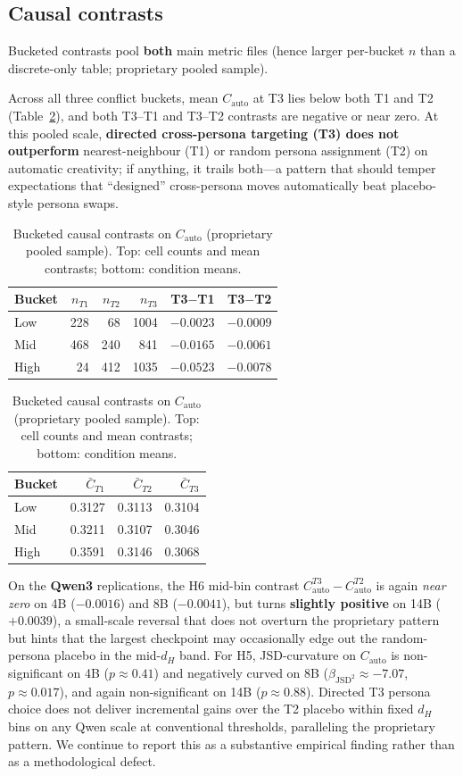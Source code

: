 \documentclass[sigconf,nonacm]{acmart}
\begin{document}
\subsection{Causal contrasts}

Bucketed contrasts pool \textbf{both} main metric files (hence larger per-bucket $n$ than a discrete-only table; proprietary pooled sample).

Across all three conflict buckets, mean $C_{\mathrm{auto}}$ at T3 lies below both T1 and T2 (Table~\ref{tab:causal}), and both T3--T1 and T3--T2 contrasts are negative or near zero. At this pooled scale, \textbf{directed cross-persona targeting (T3) does not outperform} nearest-neighbour (T1) or random persona assignment (T2) on automatic creativity; if anything, it trails both---a pattern that should temper expectations that ``designed'' cross-persona moves automatically beat placebo-style persona swaps.

\begin{table}[t]
\centering
\footnotesize
\setlength{\tabcolsep}{4pt}
\begin{tabular}{@{}lrrrrr@{}}
\toprule
Bucket & $n_{T1}$ & $n_{T2}$ & $n_{T3}$ & T3$-$T1 & T3$-$T2 \\
\midrule
Low  & 228 &  68 & 1004 & $-0.0023$ & $-0.0009$ \\
Mid  & 468 & 240 &  841 & $-0.0165$ & $-0.0061$ \\
High &  24 & 412 & 1035 & $-0.0523$ & $-0.0078$ \\
\bottomrule
\end{tabular}
\par\medskip
\begin{tabular}{@{}lrrr@{}}
\toprule
Bucket & $\bar{C}_{T1}$ & $\bar{C}_{T2}$ & $\bar{C}_{T3}$ \\
\midrule
Low  & 0.3127 & 0.3113 & 0.3104 \\
Mid  & 0.3211 & 0.3107 & 0.3046 \\
High & 0.3591 & 0.3146 & 0.3068 \\
\bottomrule
\end{tabular}
\caption{Bucketed causal contrasts on $C_{\mathrm{auto}}$ (proprietary pooled sample). Top: cell counts and mean contrasts; bottom: condition means.}
\label{tab:causal}
\end{table}

On the \textbf{Qwen3} replications, the H6 mid-bin contrast $C_{\mathrm{auto}}^{T3}{-}C_{\mathrm{auto}}^{T2}$ is again \emph{near zero} on 4B ($-0.0016$) and 8B ($-0.0041$), but turns \textbf{slightly positive} on 14B ($+0.0039$), a small-scale reversal that does not overturn the proprietary pattern but hints that the largest checkpoint may occasionally edge out the random-persona placebo in the mid-$d_H$ band. For H5, JSD-curvature on $C_{\mathrm{auto}}$ is non-significant on 4B ($p{\approx}0.41$) and negatively curved on 8B ($\beta_{\mathrm{JSD}^2}{\approx}{-}7.07$, $p{\approx}0.017$), and again non-significant on 14B ($p{\approx}0.88$). Directed T3 persona choice does not deliver incremental gains over the T2 placebo within fixed $d_H$ bins on any Qwen scale at conventional thresholds, paralleling the proprietary pattern. We continue to report this as a substantive empirical finding rather than as a methodological defect.
\end{document}
